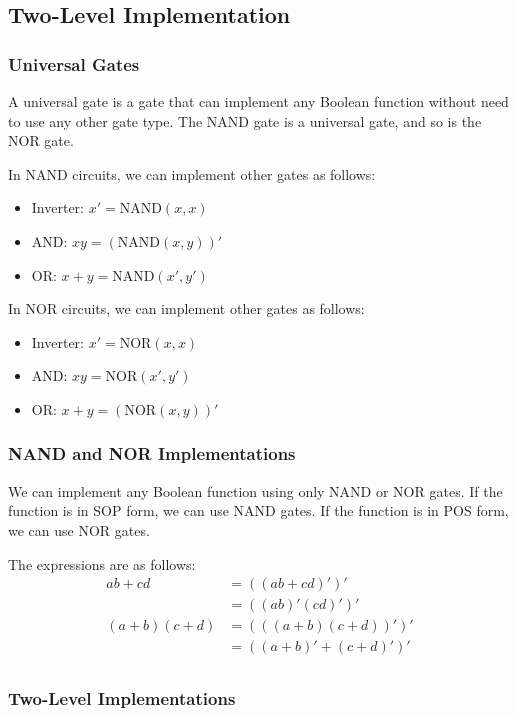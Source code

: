\documentclass[a4paper,12pt]{article}
\begin{document}
\subsection{Two-Level Implementation}

\subsubsection{Universal Gates}

A universal gate is a gate that can implement any Boolean function without need to use any other gate type.
The NAND gate is a universal gate, and so is the NOR gate.

In NAND circuits, we can implement other gates as follows:
\begin{itemize}
	\item Inverter: $x' = \text{NAND}(x, x)$
	\item AND: $xy = (\text{NAND}(x, y))'$
	\item OR: $x + y = \text{NAND}(x', y')$
\end{itemize}

In NOR circuits, we can implement other gates as follows:
\begin{itemize}
	\item Inverter: $x' = \text{NOR}(x, x)$
	\item AND: $xy = \text{NOR}(x', y')$
	\item OR: $x + y = (\text{NOR}(x, y))'$
\end{itemize}

\subsubsection{NAND and NOR Implementations}

We can implement any Boolean function using only NAND or NOR gates.
If the function is in SOP form, we can use NAND gates.
If the function is in POS form, we can use NOR gates.

The expressions are as follows:
\begin{align*}
	ab+cd &= ((ab+cd)')' \\
	&= ((ab)'(cd)')' \\
	(a+b)(c+d) &= (((a+b)(c+d))')' \\
	&= ((a+b)'+(c+d)')' \\
\end{align*}

\subsubsection{Two-Level Implementations}
\end{document}
